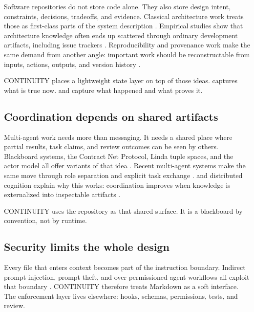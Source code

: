 Software repositories do not store code alone. They also store design intent, constraints, decisions, tradeoffs, and evidence. Classical architecture work treats those as first-class parts of the system description \cite{PerryWolf1992,Kruchten1995,TyreeAkerman2005,JansenBosch2005,ISO42010}. Empirical studies show that architecture knowledge often ends up scattered through ordinary development artifacts, including issue trackers \cite{Soliman2021AK}. Reproducibility and provenance work make the same demand from another angle: important work should be reconstructable from inputs, actions, outputs, and version history \cite{Wilson2017GoodEnough,W3CPROV,SoilandReyes2022ROCrate,Murta2014NoWorkflow}.

CONTINUITY places a lightweight state layer on top of those ideas.  captures what is true now.  and  capture what happened and what proves it.

\subsection{Coordination depends on shared artifacts}

Multi-agent work needs more than messaging. It needs a shared place where partial results, task claims, and review outcomes can be seen by others. Blackboard systems, the Contract Net Protocol, Linda tuple spaces, and the actor model all offer variants of that idea \cite{Corkill1991Blackboard,Smith1980ContractNet,Gelernter1985Linda,Hewitt1973Actor}. Recent multi-agent \LLM{} systems make the same move through role separation and explicit task exchange \cite{Wu2023AutoGen,Li2023CAMEL,Hong2023MetaGPT}. \CSCW{} and distributed cognition explain why this works: coordination improves when knowledge is externalized into inspectable artifacts \cite{Hutchins1995,Kirsh1995,Wegner1985,SchmidtSimone1996}.

CONTINUITY uses the repository as that shared surface. It is a blackboard by convention, not by runtime.

\subsection{Security limits the whole design}

Every file that enters context becomes part of the instruction boundary. Indirect prompt injection, prompt theft, and over-permissioned agent workflows all exploit that boundary \cite{Greshake2023Indirect,Liu2023HouYi,OWASPLLMTop10,SLSA}. CONTINUITY therefore treats Markdown as a soft interface. The enforcement layer lives elsewhere: hooks, schemas, permissions, tests, and review.
